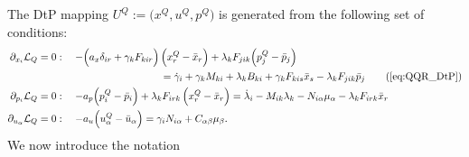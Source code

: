 \documentclass[11pt]{article}
\begin{document}
The DtP mapping $U^Q := \big(x^Q,u^Q,p^Q \big)$ is generated from the following set of conditions:
\begin{subequations}
    \label{eq:QQR_DtP}
    \allowdisplaybreaks
    \begin{align}
        \p_{x_i} \scl_Q &= 0: \quad - \Big( a_x \delta_{ir} + \gamma_k F_{kir} \Big) \,\Big(x^Q_r - \bar{x}_r \Big) + \lambda_k F_{jik} \Big( p^Q_j - \bar{p}_j \Big) \notag\\
        & \qquad \qquad \qquad \qquad \qquad \qquad = \dot{\gamma}_i + \gamma_k M_{ki} + \lambda_k B_{ki} + \gamma_k F_{kis} \bar{x}_s - \lambda_k F_{jik} \bar{p}_j \tag{\ref{eq:QQR_DtP}}\\
        \p_{p_i} \scl_Q & = 0: \quad - a_p \Big(p^Q_i - \bar{p}_i \Big) + \lambda_k F_{irk} \,\Big(x^Q_r - \bar{x}_r \Big) = \dot{\lambda}_i - M_{ik} \lambda_k - N_{i\alpha} \mu_\alpha - \lambda_k F_{irk} \bar{x}_r \notag\\
        \p_{u_\alpha} \scl_Q & = 0: \quad - a_u \Big(u^Q_\alpha - \bar{u}_\alpha \Big)  = \gamma_i N_{i \alpha} + C_{\alpha \beta} \mu_\beta. \notag
    \end{align}
\end{subequations}
We now introduce the notation
\end{document}
